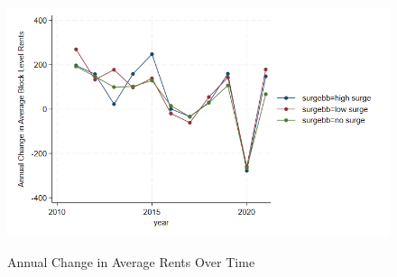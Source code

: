 \documentclass[12pt]{article}
\begin{document}
{{{{{{\begin{figure}[h!]
\caption{Annual Change in Average Rents Over Time}
\label{fig:damsurge}
\begin{center}
\includegraphics[scale = 0.5]{Samples/R7 SE Rent Change Over Time.png}
\label{fig:rentchange}
\end{center}
\end{figure}

}}}}}}
\end{document}
